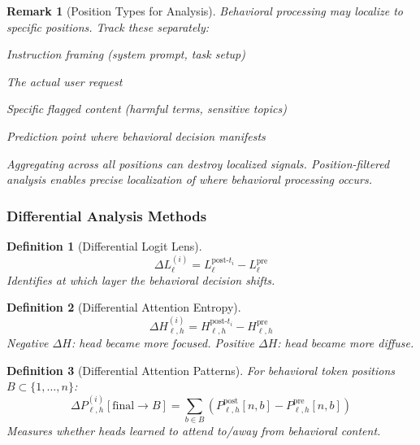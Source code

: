 \documentclass[11pt]{article}
\newtheorem{definition}{Definition}[section]
\newtheorem{remark}{Remark}[section]
\begin{document}
\begin{remark}[Position Types for Analysis]
\label{rem:position-types-for-analysis}
Behavioral processing may localize to specific positions. Track these separately:
\begin{description}[nosep, leftmargin=1em]
\item[First tokens:] Instruction framing (system prompt, task setup)
\item[Query tokens:] The actual user request
\item[Behavioral content tokens:] Specific flagged content (harmful terms, sensitive topics)
\item[Final token:] Prediction point where behavioral decision manifests
\end{description}
Aggregating across all positions can destroy localized signals. Position-filtered analysis enables precise localization of where behavioral processing occurs.
\end{remark}

\subsubsection{Differential Analysis Methods}
\label{sec:llm-differential-analysis-methods}

\begin{definition}[Differential Logit Lens]
\label{def:differential-logit-lens}
\begin{equation}
\Delta L^{(i)}_\ell = L^{\text{post-}t_i}_\ell - L^{\text{pre}}_\ell
\end{equation}
Identifies at which layer the behavioral decision shifts.
\end{definition}

\begin{definition}[Differential Attention Entropy]
\label{def:differential-attention-entropy}
\begin{equation}
\Delta H^{(i)}_{\ell,h} = H^{\text{post-}t_i}_{\ell,h} - H^{\text{pre}}_{\ell,h}
\end{equation}
Negative $\Delta H$: head became more focused. Positive $\Delta H$: head became more diffuse.
\end{definition}

\begin{definition}[Differential Attention Patterns]
\label{def:differential-attention-patterns}
For behavioral token positions $B \subset \{1, \ldots, n\}$:
\begin{equation}
\Delta P^{(i)}_{\ell,h}[\text{final} \to B] = \sum_{b \in B} \left(P^{\text{post}}_{\ell,h}[n, b] - P^{\text{pre}}_{\ell,h}[n, b]\right)
\end{equation}
Measures whether heads learned to attend to/away from behavioral content.
\end{definition}
\end{document}
